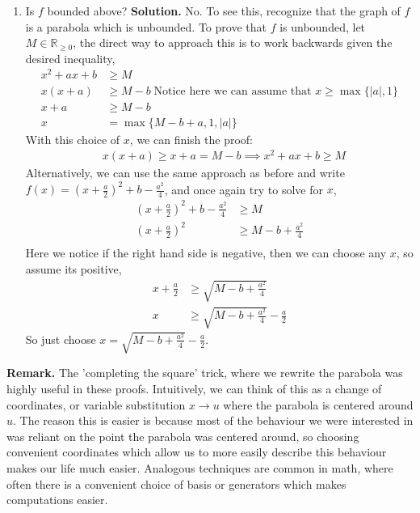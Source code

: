 \documentclass[10.5pt]{article}
\theoremstyle{definition}
\newcommand{\set}[1]{\{#1\}}
\newcommand{\abs}[1]{\lvert#1\rvert}
\begin{document}
\begin{enumerate}
        \item Is \(f\) bounded above? \newline
        \textbf{Solution.} No. To see this, recognize that the graph of \(f\) is a parabola which is unbounded.
        To prove that \(f\) is unbounded, let \(M \in \mathbb{R}_{\geq 0}\), the direct way to approach this is to work backwards given the desired inequality,
        \begin{align*}
            x^2 + ax + b &\geq M \\
            x(x + a) &\geq M - b \; \text{Notice here we can assume that } x\geq \max\set{\abs{a},1}\\
            x + a &\geq M - b\\
            x &= \max\set{M-b+a,1,\abs{a}}
        \end{align*}
        With this choice of \(x\), we can finish the proof:
        \begin{align*}
            &x(x+a) \geq x + a = M - b \implies x^2 + ax + b \geq M
        \end{align*}
        Alternatively, we can use the same approach as before and write \(f(x) = \left(x+\frac{a}{2}\right)^2 + b - \frac{a^2}{4}\), and once again try to solve for \(x\),
        \begin{align*}
            \left(x+\frac{a}{2}\right)^2 + b - \frac{a^2}{4} &\geq M \\
            \left(x+\frac{a}{2}\right)^2 &\geq M - b + \frac{a^2}{4} \\
        \end{align*}
        Here we notice if the right hand side is negative, then we can choose any \(x\), so assume its positive,
        \begin{align*}
            x + \frac{a}{2} &\geq \sqrt{M - b + \frac{a^2}{4}} \\
            x &\geq \sqrt{M - b + \frac{a^2}{4}} - \frac{a}{2}
        \end{align*}
        So just choose \(x = \sqrt{M - b + \frac{a^2}{4}} - \frac{a}{2}\).
    \end{enumerate}

    \textbf{Remark.} The 'completing the square' trick, where we rewrite the parabola was highly useful in these proofs.
    Intuitively, we can think of this as a change of coordinates, or variable substitution \(x \to u\) where the parabola is centered around \(u\). The reason this
    is easier is because most of the behaviour we were interested in was reliant on the point the parabola was centered around, so choosing convenient coordinates
    which allow us to more easily describe this behaviour makes our life much easier. Analogous techniques are common in math, where often there is a
    convenient choice of basis or generators which makes computations easier.
\end{document}
